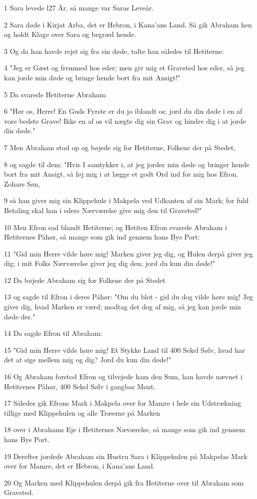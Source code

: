 \par 1 Sara levede l27 År, så mange var Saras Leveår.
\par 2 Sara døde i Kirjat Arba, det er Hebron, i Kana'ans Land. Så gik Abraham hen og holdt Klage over Sara og begræd hende.
\par 3 Og da han havde rejst sig fra sin døde, talte han således til Hetiterne:
\par 4 "Jeg er Gæst og fremmed hos eder; men giv mig et Gravsted hos eder, så jeg kan jorde min døde og bringe hende bort fra mit Ansigt!"
\par 5 Da svarede Hetiterne Abraham:
\par 6 "Hør os, Herre! En Guds Fyrste er du jo iblandt os; jord du din døde i en af vore bedste Grave! Ikke en af os vil nægte dig sin Grav og hindre dig i at jorde din døde."
\par 7 Men Abraham stod op og bøjede sig for Hetiterne, Folkene der på Stedet,
\par 8 og sagde til dem: "Hvis I samtykker i, at jeg jorder min døde og bringer hende bort fra mit Ansigt, så føj mig i at lægge et godt Ord ind for mig hos Efron, Zohars Søn,
\par 9 så han giver mig sin Klippehule i Makpela ved Udkanten af sin Mark; for fuld Betaling skal han i eders Nærværelse give mig den til Gravsted!"
\par 10 Men Efron sad blandt Hetiterne; og Hetiten Efron svarede Abraham i Hetiternes Påhør, så mange som gik ind gennem hans Bys Port:
\par 11 "Gid min Herre vilde høre mig! Marken giver jeg dig, og Hulen derpå giver jeg dig; i mit Folks Nærværelse giver jeg dig den; jord du kun din døde!"
\par 12 Da bøjede Abraham sig for Folkene der på Stedet
\par 13 og sagde til Efron i deres Påhør: "Om du blot - gid du dog vilde høre mig! Jeg giver dig, hvad Marken er værd; modtag det dog af mig, så jeg kan jorde min døde der."
\par 14 Da sagde Efron til Abraham:
\par 15 "Gid min Herre vilde høre mig! Et Stykke Land til 400 Sekel Sølv, hvad har det at sige mellem mig og dig? Jord du kun din døde!"
\par 16 Og Abraham forstod Efron og tilvejede ham den Sum, han havde nævnet i Hetiternes Påhør, 400 Sekel Sølv i gangbar Mønt.
\par 17 Således gik Efrons Mark i Makpela over for Mamre i hele sin Udstrækning tillige med Klippehulen og alle Træerne på Marken
\par 18 over i Abrahams Eje i Hetiternes Næværelse, så mange som gik ind gennem hans Bys Port.
\par 19 Derefter jordede Abraham sin Hustru Sara i Klippehulen på Makpelas Mark over for Mamre, det er Hebron, i Kana'ans Land.
\par 20 Og Marken med Klippehulen derpå gik fra Hetiterne over til Abraham som Gravsted.

